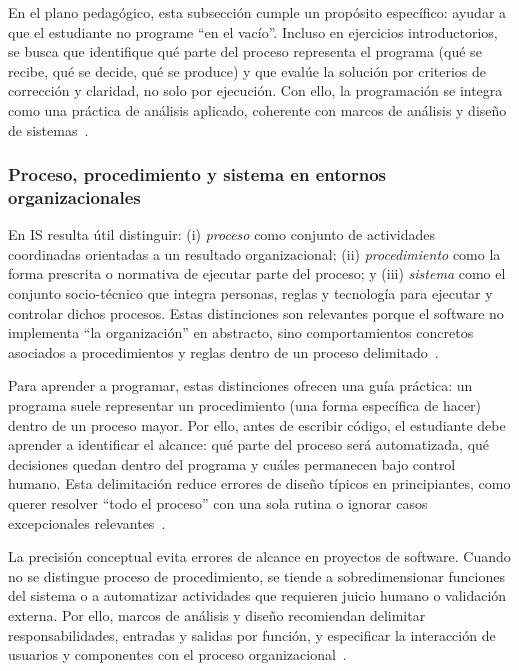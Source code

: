 \documentclass[12pt,twoside]{book}
\begin{document}
					En el plano pedagógico, esta subsección cumple un propósito específico: ayudar a que el estudiante no programe “en el vacío”. Incluso en ejercicios introductorios, se busca que identifique qué parte del proceso representa el programa (qué se recibe, qué se decide, qué se produce) y que evalúe la solución por criterios de corrección y claridad, no solo por ejecución. Con ello, la programación se integra como una práctica de análisis aplicado, coherente con marcos de análisis y diseño de sistemas~\cite{Kendall2014Systems,Tegarden2025Systems,Hanly2015Problem}.
					
					\subsubsection{Proceso, procedimiento y sistema en entornos organizacionales}
						\noindent
						En IS resulta útil distinguir: (i) \emph{proceso} como conjunto de actividades coordinadas orientadas a un resultado organizacional; (ii) \emph{procedimiento} como la forma prescrita o normativa de ejecutar parte del proceso; y (iii) \emph{sistema} como el conjunto socio-técnico que integra personas, reglas y tecnología para ejecutar y controlar dichos procesos. Estas distinciones son relevantes porque el software no implementa “la organización” en abstracto, sino comportamientos concretos asociados a procedimientos y reglas dentro de un proceso delimitado~\cite{Laudon2020Management,Kendall2014Systems,Gonzalez-Longatt2007Introduccion}.
						
						Para aprender a programar, estas distinciones ofrecen una guía práctica: un programa suele representar un procedimiento (una forma específica de hacer) dentro de un proceso mayor. Por ello, antes de escribir código, el estudiante debe aprender a identificar el alcance: qué parte del proceso será automatizada, qué decisiones quedan dentro del programa y cuáles permanecen bajo control humano. Esta delimitación reduce errores de diseño típicos en principiantes, como querer resolver “todo el proceso” con una sola rutina o ignorar casos excepcionales relevantes~\cite{Hanly2015Problem,Gaddis2022Starting,Kendall2014Systems}.
						
						La precisión conceptual evita errores de alcance en proyectos de software. Cuando no se distingue proceso de procedimiento, se tiende a sobredimensionar funciones del sistema o a automatizar actividades que requieren juicio humano o validación externa. Por ello, marcos de análisis y diseño recomiendan delimitar responsabilidades, entradas y salidas por función, y especificar la interacción de usuarios y componentes con el proceso organizacional~\cite{Tegarden2025Systems,Kendall2014Systems,Booch2007Object}.
						
\end{document}
